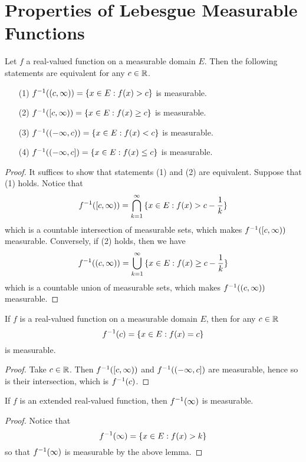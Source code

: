 \section{Properties of Lebesgue Measurable Functions}

\begin{lemma}\label{9.1.1}
    Let $f$ a real-valued function on a measurable domain $E$. Then the following
    statements are equivalent for any $c \in \mathbb{R}$.
    \begin{enumerate}
        \item[(1)] $f^{-1}((c,\infty))=\{x \in E : f(x)>c\}$ is measurable.

        \item[(2)] $f^{-1}([c,\infty))=\{x \in E : f(x)\geq c\}$ is measurable.

        \item[(3)] $f^{-1}((-\infty,c))=\{x \in E : f(x)<c\}$ is measurable.

        \item[(4)] $f^{-1}((-\infty,c])=\{x \in E : f(x) \leq c\}$ is measurable.
    \end{enumerate}
\end{lemma}
\begin{proof}
    It suffices to show that statements (1) and (2) are equivalent. Suppose that
    (1) holds. Notice that
    \begin{equation*}
        f^{-1}([c,\infty))=\bigcap_{k=1}^\infty{\{x \in E : f(x)>c-\frac{1}{k}\}}
    \end{equation*}
    which is a countable intersection of measurable sets, which makes
    $f^{-1}([c,\infty))$ measurable. Conversely, if (2) holds, then we have
    \begin{equation*}
        f^{-1}((c,\infty))=\bigcup_{k=1}^\infty{\{x \in E : f(x) \geq
        c-\frac{1}{k}\}}
    \end{equation*}
    which is a countable union of measurable sets, which makes
    $f^{-1}((c,\infty))$ measurable.
\end{proof}
\begin{corollary}
    If $f$ is a real-valued function on a measurable domain $E$, then for any $c
    \in \mathbb{R}$
    \begin{equation*}
        f^{-1}(c)=\{x \in E : f(x)=c\}
    \end{equation*}
    is measurable.
\end{corollary}
\begin{proof}
    Take $c \in \mathbb{R}$. Then  $f^{-1}([c,\infty))$ and $f^{-1}((-\infty,c])$ are
    measurable, hence so is their intersection, which is $f^{-1}(c)$.
\end{proof}
\begin{corollary}
    If $f$ is an extended real-valued function, then  $f^{-1}(\infty)$ is
    measurable.
\end{corollary}
\begin{proof}
    Notice that
    \begin{equation*}
        f^{-1}(\infty)=\{x \in E : f(x)>k\}
    \end{equation*}
    so that $f^{-1}(\infty)$ is measurable by the above lemma.
\end{proof}

